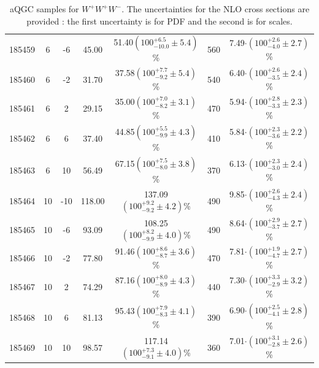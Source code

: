 \begin{table}[ht!]
{\begin{tabular}{c|c|c|c|c|c|c}
185459 & 6     &  -6  &  45.00      &    51.40$(100^{+6.5}_{-10.0}\pm 5.4  )$\%    &     560     &           7.49$\cdot (100^{+2.6}_{-4.0}\pm 2.7)$\% \\
185460 & 6     &  -2  &  31.70    &    37.58$(100^{+7.7}_{-9.2}\pm 5.4 )$\%   &       540     &           6.40$\cdot (100^{+2.6}_{-3.5}\pm 2.4)$\% \\
185461 & 6     &  2   &  29.15   &    35.00$(100^{+7.0}_{-8.2}\pm 3.1 )$\%      &     470     &           5.94$\cdot (100^{+2.8}_{-3.3}\pm 2.3)$\% \\
185462 & 6     &  6   &  37.40    &    44.85$(100^{+5.5}_{-9.9}\pm 4.3 )$\%   &       410     &           5.84$\cdot (100^{+2.3}_{-3.6}\pm 2.2)$\% \\
185463 &  6    &  10  &  56.49   &    67.15$(100^{+7.5}_{-8.0}\pm 3.8)$\%   &        370     &           6.13$\cdot (100^{+2.3}_{-3.0}\pm 2.4)$\% \\
\hline
185464 & 10    &  -10 &  118.00     &    137.09$(100^{+9.2}_{-9.2}\pm 4.2  )$\%  &     490     &           9.85$\cdot (100^{+2.6}_{-4.3}\pm 2.4)$\% \\
185465 & 10    &  -6  &  93.09   &    108.25$(100^{+8.2}_{-9.9}\pm 4.0)$\%  &        490     &           8.64$\cdot (100^{+2.9}_{-3.7}\pm 2.7)$\% \\
185466 & 10    &  -2  &  77.80    &    91.46$(100^{+8.6}_{-8.7}\pm 3.6 )$\%   &       470     &           7.81$\cdot (100^{+1.9}_{-4.7}\pm 2.7 )$\% \\
185467 & 10    &  2   &  74.29   &    87.16$(100^{+8.0}_{-8.9}\pm  4.3)$\%   &        440     &           7.30$\cdot (100^{+3.3}_{-2.9}\pm 3.2)$\% \\
185468 & 10    &  6   &  81.13   &    95.43$(100^{+7.9}_{-8.3}\pm 4.1)$\%   &        390     &           6.90$\cdot (100^{+2.5}_{-4.1}\pm 2.8)$\% \\
185469 & 10    &  10 &   98.57   &    117.14$(100^{+7.3}_{-9.1}\pm 4.0 )$\%  &        360     &           7.01$\cdot (100^{+3.1}_{-2.8}\pm 2.6)$\% \\
\hline
\end{tabular}
}
\caption{aQGC samples for $W^+W^+W^-$. The uncertainties for the NLO cross sections are provided : the first uncertainty is for PDF and the second is for scales.}
\label{tab:signalNormaPPM}
\end{table}





















